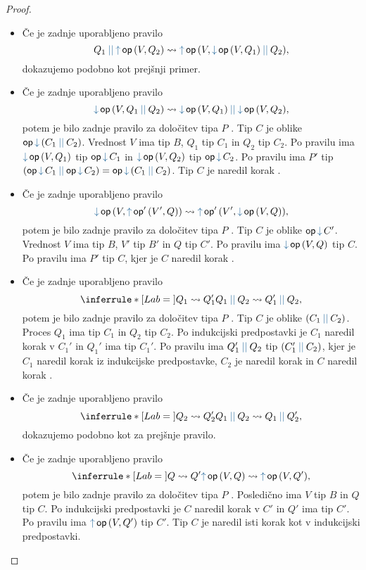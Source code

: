 \begin{proof}
\begin{itemize}
		\item Če je zadnje uporabljeno pravilo
		$$\tmpar{Q_1}{\tmopout{op}{V}{Q_2}} \reduces \tmopout{op}{V}{\tmpar{\tmopin{op}{V}{Q_1}}{Q_2}},$$
		dokazujemo podobno kot prejšnji primer.
	
		\item Če je zadnje uporabljeno pravilo
		$$\tmopin{op}{V}{\tmpar{Q_1}{Q_2}} \reduces \tmpar {\tmopin{op}{V}{Q_1}} {\tmopin{op}{V}{Q_2}},$$
		potem je bilo zadnje pravilo za določitev tipa $P$ . Tip $C$ je oblike $\opincomp{op}{\typar{C_1}{C_2}}$.
		Vrednost $V$ ima tip $B$, $Q_1$ tip $C_1$ in $Q_2$ tip $C_2$.
		Po pravilu  ima $\tmopin{op}{V}{Q_1}$ tip $\opincomp{op}{C_1}$ in $\tmopin{op}{V}{Q_2}$ tip $\opincomp{op}{C_2}$.
		Po pravilu  ima $P'$ tip $\typar{\opincomp{op}{C_1}}{\opincomp{op}{C_2}} = \opincomp{op}{\typar{C_1}{C_2}}$. Tip $C$ je naredil korak .
		
		\item Če je zadnje uporabljeno pravilo
		$$\tmopin{op}{V}{\tmopout{op'}{V'}{Q}} \reduces \tmopout{op'}{V'}{\tmopin{op}{V}{Q}},$$
		potem je bilo zadnje pravilo za določitev tipa $P$ . Tip $C$ je oblike $\opincomp{op}{C'}$.
		Vrednost $V$ ima tip $B$, $V'$ tip $B'$ in $Q$ tip $C'$.
		Po pravilu  ima $\tmopin{op}{V}{Q}$ tip $C$.
		Po pravilu  ima $P'$ tip $C$, kjer je $C$ naredil korak .
		
		\item Če je zadnje uporabljeno pravilo
		$$
		\coopinfer{}{
			Q_1 \reduces Q_1'
		}{
			\tmpar{Q_1}{Q_2}  \reduces \tmpar{Q_1'}{Q_2}
		},$$
		potem je bilo zadnje pravilo za določitev tipa $P$ . Tip $C$ je oblike $\typar{C_1}{C_2}$.
		Proces $Q_1$ ima tip $C_1$ in $Q_2$ tip $C_2$.
		Po indukcijski predpostavki je $C_1$ naredil korak v $C_1'$ in $Q_1'$ ima tip $C_1'$.
		Po pravilu  ima $\tmpar{Q_1'}{Q_2}$ tip $\typar{C_1'}{C_2}$, kjer je $C_1$ naredil korak iz indukcijske predpostavke, $C_2$ je naredil korak  in $C$ naredil korak .

		\item Če je zadnje uporabljeno pravilo
		$$
		\coopinfer{}{
			Q_2 \reduces Q_2'
		}{
			\tmpar{Q_1}{Q_2}  \reduces \tmpar{Q_1}{Q_2'}
		},$$
		dokazujemo podobno kot za prejšnje pravilo.
		
		\item Če je zadnje uporabljeno pravilo
		$$
		\coopinfer{}{
			Q \reduces Q'
		}{
			\tmopout{op}{V}{Q}  \reduces \tmopout{op}{V}{Q'}
		},$$
		potem je bilo zadnje pravilo za določitev tipa $P$ .
		Posledično ima $V$ tip $B$ in $Q$ tip $C$.
		Po indukcijski predpostavki je $C$ naredil korak v $C'$ in $Q'$ ima tip $C'$.
		Po pravilu  ima $\tmopout{op}{V}{Q'}$ tip $C'$. Tip $C$ je naredil isti korak kot v indukcijski predpostavki.
		

\end{itemize}
\end{proof}
